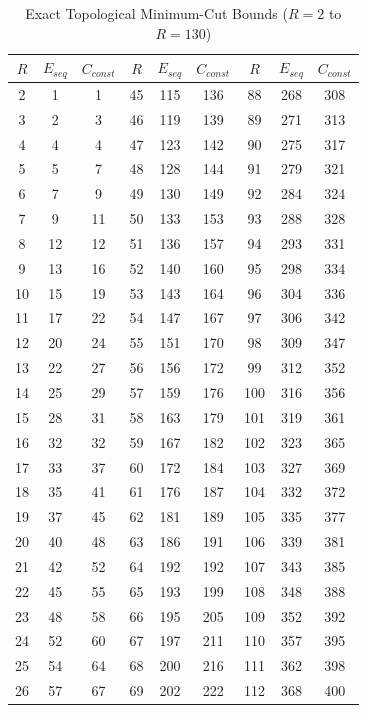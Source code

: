 \documentclass[11pt, letterpaper]{article}
\theoremstyle{definition}
\theoremstyle{remark}
\begin{document}
\begin{table}[H]
\centering
\caption{Exact Topological Minimum-Cut Bounds ($R=2$ to $R=130$)}
\small
\begin{tabular}{ccc|ccc|ccc}
\toprule
$R$ & $E_{seq}$ & $C_{const}$ & $R$ & $E_{seq}$ & $C_{const}$ & $R$ & $E_{seq}$ & $C_{const}$ \\
\midrule
2 & 1 & 1 & 45 & 115 & 136 & 88 & 268 & 308 \\
3 & 2 & 3 & 46 & 119 & 139 & 89 & 271 & 313 \\
4 & 4 & 4 & 47 & 123 & 142 & 90 & 275 & 317 \\
5 & 5 & 7 & 48 & 128 & 144 & 91 & 279 & 321 \\
6 & 7 & 9 & 49 & 130 & 149 & 92 & 284 & 324 \\
7 & 9 & 11 & 50 & 133 & 153 & 93 & 288 & 328 \\
8 & 12 & 12 & 51 & 136 & 157 & 94 & 293 & 331 \\
9 & 13 & 16 & 52 & 140 & 160 & 95 & 298 & 334 \\
10 & 15 & 19 & 53 & 143 & 164 & 96 & 304 & 336 \\
11 & 17 & 22 & 54 & 147 & 167 & 97 & 306 & 342 \\
12 & 20 & 24 & 55 & 151 & 170 & 98 & 309 & 347 \\
13 & 22 & 27 & 56 & 156 & 172 & 99 & 312 & 352 \\
14 & 25 & 29 & 57 & 159 & 176 & 100 & 316 & 356 \\
15 & 28 & 31 & 58 & 163 & 179 & 101 & 319 & 361 \\
16 & 32 & 32 & 59 & 167 & 182 & 102 & 323 & 365 \\
17 & 33 & 37 & 60 & 172 & 184 & 103 & 327 & 369 \\
18 & 35 & 41 & 61 & 176 & 187 & 104 & 332 & 372 \\
19 & 37 & 45 & 62 & 181 & 189 & 105 & 335 & 377 \\
20 & 40 & 48 & 63 & 186 & 191 & 106 & 339 & 381 \\
21 & 42 & 52 & 64 & 192 & 192 & 107 & 343 & 385 \\
22 & 45 & 55 & 65 & 193 & 199 & 108 & 348 & 388 \\
23 & 48 & 58 & 66 & 195 & 205 & 109 & 352 & 392 \\
24 & 52 & 60 & 67 & 197 & 211 & 110 & 357 & 395 \\
25 & 54 & 64 & 68 & 200 & 216 & 111 & 362 & 398 \\
26 & 57 & 67 & 69 & 202 & 222 & 112 & 368 & 400 \\

\end{tabular}
\end{table}
\end{document}
